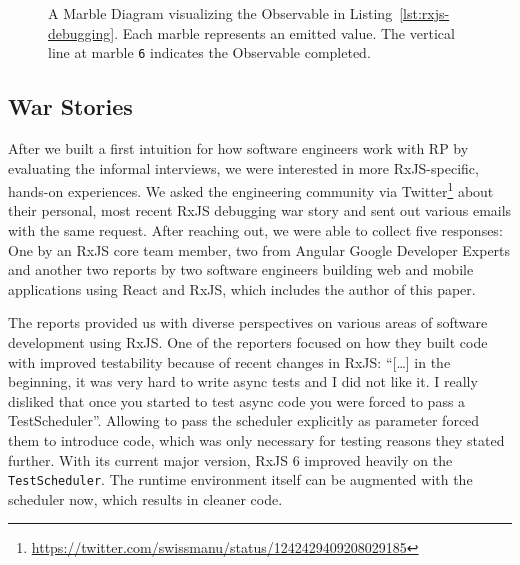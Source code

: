 \documentclass[12pt,a4paper]{article}
\begin{document}
\begin{figure}[H]
	\centering
	
	\caption{A Marble Diagram visualizing the Observable in Listing~\ref{lst:rxjs-debugging}. Each marble represents an emitted value. The vertical line at marble \texttt{6} indicates the Observable completed.}
	\label{fig:marble-diagram}
\end{figure}

\subsection{War Stories}

After we built a first intuition for how software engineers work with RP by evaluating the informal interviews, we were interested in more RxJS-specific, hands-on experiences. We asked the engineering community via Twitter\footnote{\url{https://twitter.com/swissmanu/status/1242429409208029185}} about their personal, most recent RxJS debugging war story and sent out various emails with the same request. After reaching out, we were able to collect five responses: One by an RxJS core team member, two from Angular Google Developer Experts and another two reports by two software engineers building web and mobile applications using React and RxJS, which includes the author of this paper.

The reports provided us with diverse perspectives on various areas of software development using RxJS. One of the reporters focused on how they built code with improved testability because of recent changes in RxJS: ``[\dots] in the beginning, it was very hard to write async tests and I did not like it. I really disliked that once you started to test async code you were forced to pass a TestScheduler''. Allowing to pass the scheduler explicitly as parameter forced them to introduce code, which was only necessary for testing reasons they stated further. With its current major version, RxJS 6 improved heavily on the  \texttt{TestScheduler}. The runtime environment itself can be augmented with the scheduler now, which results in cleaner code.
\end{document}
